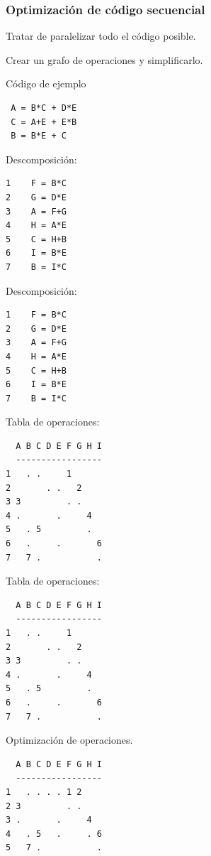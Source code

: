 \documentclass{beamer}
\begin{document}
\begin{frame}
\frametitle{Optimización de código secuencial}
Tratar de paralelizar todo el código posible.

Crear un grafo de operaciones y simplificarlo.
\end{frame}



\begin{frame}[fragile]
Código de ejemplo

\begin{lstlisting}
 A = B*C + D*E
 C = A+E + E*B
 B = B*E + C
\end{lstlisting}

Descomposición:

\begin{lstlisting}
1    F = B*C
2    G = D*E
3    A = F+G
4    H = A*E
5    C = H+B
6    I = B*E
7    B = I*C
\end{lstlisting}

\end{frame}



\begin{frame}[fragile]
Descomposición:
\begin{lstlisting}
1    F = B*C
2    G = D*E
3    A = F+G
4    H = A*E
5    C = H+B
6    I = B*E
7    B = I*C
\end{lstlisting}
Tabla de operaciones:
\begin{lstlisting}
  A B C D E F G H I
  -----------------
1   . .     1      
2       . .   2        
3 3         . .        
4 .       .     4     
5   . 5         .
6   .     .       6
7   7 .           .
\end{lstlisting}
\end{frame}



\begin{frame}[fragile]
Tabla de operaciones:
\begin{lstlisting}
  A B C D E F G H I
  -----------------
1   . .     1      
2       . .   2        
3 3         . .        
4 .       .     4     
5   . 5         .
6   .     .       6
7   7 .           .
\end{lstlisting}
Optimización de operaciones.
\begin{lstlisting}
  A B C D E F G H I
  -----------------
1   . . . . 1 2    
2 3         . .       
3 .       .     4    
4   . 5   .     . 6
5   7 .           .
\end{lstlisting}
\end{frame}
\end{document}
